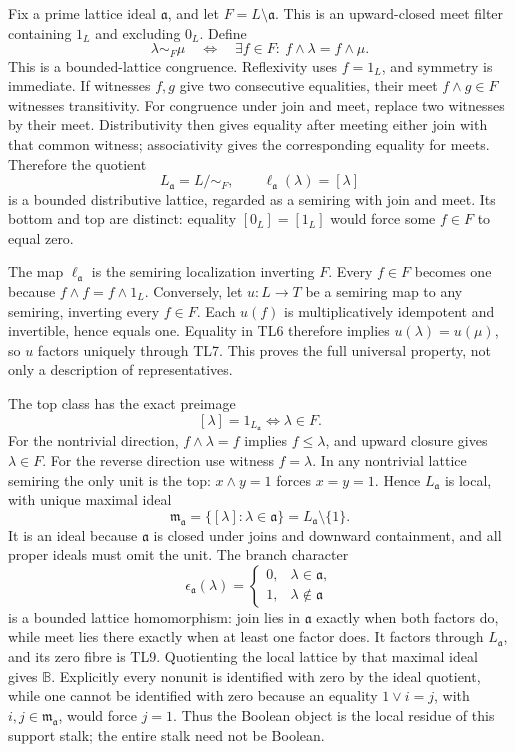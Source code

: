 \documentclass[11pt,a4paper]{article}
\theoremstyle{definition}\newtheorem{definition}[theorem]{Definition}
\begin{document}
Fix a prime lattice ideal \(\mathfrak a\), and let
\(F=L\setminus\mathfrak a\). This is an upward-closed meet filter
containing \(1_L\) and excluding \(0_L\). Define \[
 \lambda\sim_F\mu
 \quad\Longleftrightarrow\quad
 \exists f\in F:\ f\wedge\lambda=f\wedge\mu.
 \tag{TL6}
\] This is a bounded-lattice congruence. Reflexivity uses \(f=1_L\), and
symmetry is immediate. If witnesses \(f,g\) give two consecutive
equalities, their meet \(f\wedge g\in F\) witnesses transitivity. For
congruence under join and meet, replace two witnesses by their meet.
Distributivity then gives equality after meeting either join with that
common witness; associativity gives the corresponding equality for
meets. Therefore the quotient \[
 L_{\mathfrak a}=L/{\sim_F},\qquad \ell_{\mathfrak a}(\lambda)=[\lambda]
 \tag{TL7}
\] is a bounded distributive lattice, regarded as a semiring with join
and meet. Its bottom and top are distinct: equality \([0_L]=[1_L]\)
would force some \(f\in F\) to equal zero.

The map \(\ell_{\mathfrak a}\) is the semiring localization inverting
\(F\). Every \(f\in F\) becomes one because \(f\wedge f=f\wedge1_L\).
Conversely, let \(u:L\to T\) be a semiring map to any semiring,
inverting every \(f\in F\). Each \(u(f)\) is multiplicatively idempotent
and invertible, hence equals one. Equality in TL6 therefore implies
\(u(\lambda)=u(\mu)\), so \(u\) factors uniquely through TL7. This
proves the full universal property, not only a description of
representatives.

The top class has the exact preimage \[
 [\lambda]=1_{L_{\mathfrak a}}\iff\lambda\in F.
 \tag{TL8}
\] For the nontrivial direction, \(f\wedge\lambda=f\) implies
\(f\le\lambda\), and upward closure gives \(\lambda\in F\). For the
reverse direction use witness \(f=\lambda\). In any nontrivial lattice
semiring the only unit is the top: \(x\wedge y=1\) forces \(x=y=1\).
Hence \(L_{\mathfrak a}\) is local, with unique maximal ideal \[
 \mathfrak m_{\mathfrak a}=\{[\lambda]:\lambda\in\mathfrak a\}
 =L_{\mathfrak a}\setminus\{1\}.
 \tag{TL9}
\] It is an ideal because \(\mathfrak a\) is closed under joins and
downward containment, and all proper ideals must omit the unit. The
branch character \[
 \epsilon_{\mathfrak a}(\lambda)=
 \begin{cases}0,&\lambda\in\mathfrak a,\\1,&\lambda\notin\mathfrak a\end{cases}
 \tag{TL10}
\] is a bounded lattice homomorphism: join lies in \(\mathfrak a\)
exactly when both factors do, while meet lies there exactly when at
least one factor does. It factors through \(L_{\mathfrak a}\), and its
zero fibre is TL9. Quotienting the local lattice by that maximal ideal
gives \(\mathbb B\). Explicitly every nonunit is identified with zero by
the ideal quotient, while one cannot be identified with zero because an
equality \(1\vee i=j\), with \(i,j\in\mathfrak m_{\mathfrak a}\), would
force \(j=1\). Thus the Boolean object is the local residue of this
support stalk; the entire stalk need not be Boolean.
\end{document}
